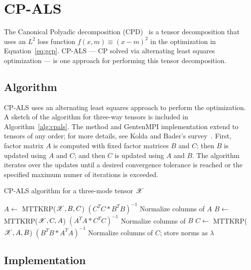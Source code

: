 
\chapter{CP-ALS} \label{sec:cpals}

The Canonical Polyadic decomposition (CPD)~\cite{CC70,Harshman70}
is a tensor decomposition that uses an $L^2$ loss function
$f(x,m) \equiv (x-m)^2$ in the optimization in Equation~\ref{eq:gcp}.
CP-ALS --- CP solved via alternating least squares optimization ---
is one approach for performing this tensor decomposition.

\section{Algorithm} \label{sec:cpals_alg}

CP-ALS uses an alternating least squares approach to perform
the optimization. A sketch of the algorithm for three-way tensors 
is included in Algorithm~\ref{alg:cpals}. The method and GentenMPI 
implementation extend to tensors
of any order; for more details, see Kolda and Bader's
survey~\cite{KB09}.  First, factor matrix $A$ is computed with fixed 
factor matrices $B$ and $C$; then $B$ is updated using $A$ and $C$; and
then $C$ is updated using $A$ and $B$.  The algorithm iterates over the 
updates until a desired convergence tolerance is reached or the specified
maximum numer of iterations is exceeded.


\begin{algorithm}
  \caption{CP-ALS algorithm for a three-mode tensor $\X$}
  \label{alg:cpals}
  \begin{algorithmic}[1]
    \Repeat{}
      \State $A \gets $ MTTKRP($\X,B,C$) $(C^T C * B^T B)^{-1}$
      \State Normalize columns of $A$
      \State $B \gets $ MTTKRP($\X,C,A$) $(A^T A * C^T C)^{-1}$
      \State Normalize columns of $B$
      \State $C \gets $ MTTKRP($\X,A,B$) $(B^T B * A^T A)^{-1}$
      \State Normalize columns of $C$; store norms as $\lambda$
    \State \Return{$[\lambda;A,B,C]$}
    \EndProcedure
  \end{algorithmic}
\end{algorithm}


\section{Implementation} \label{sec:cpals_impl}


